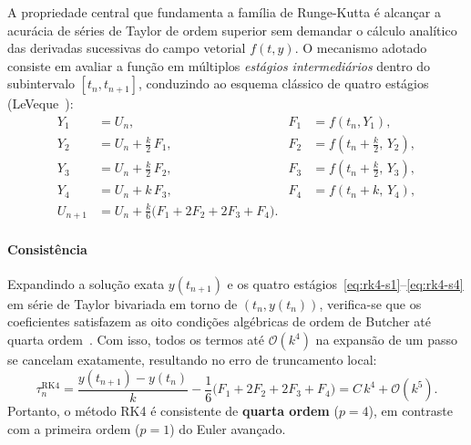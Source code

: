 \documentclass[12pt, a4paper]{article}
\begin{document}
A propriedade central que fundamenta a família de Runge-Kutta é alcançar a acurácia de séries de Taylor de ordem superior sem demandar o cálculo analítico das derivadas sucessivas do campo vetorial $f(t, y)$. O mecanismo adotado consiste em avaliar a função em múltiplos \emph{estágios intermediários} dentro do subintervalo $[t_n, t_{n+1}]$, conduzindo ao esquema clássico de quatro estágios (LeVeque~\cite{leveque2007}):
\begin{subequations}\label{eq:rk4}
\begin{align}
  Y_1 &= U_n,                          & F_1 &= f(t_n, Y_1), \label{eq:rk4-s1}\\
  Y_2 &= U_n + \frac{k}{2}\,F_1,       & F_2 &= f\!\left(t_n + \frac{k}{2},\, Y_2\right), \label{eq:rk4-s2}\\
  Y_3 &= U_n + \frac{k}{2}\,F_2,       & F_3 &= f\!\left(t_n + \frac{k}{2},\, Y_3\right), \label{eq:rk4-s3}\\
  Y_4 &= U_n + k\,F_3,                 & F_4 &= f(t_n + k,\, Y_4), \label{eq:rk4-s4}\\
  U_{n+1} &= U_n + \frac{k}{6}\bigl(F_1 + 2F_2 + 2F_3 + F_4\bigr). \label{eq:rk4-comb}
\end{align}
\end{subequations}

\paragraph{Consistência} Expandindo a solução exata $y(t_{n+1})$ e os quatro estágios~\eqref{eq:rk4-s1}--\eqref{eq:rk4-s4}
em série de Taylor bivariada em torno de $(t_n, y(t_n))$, verifica-se que os coeficientes satisfazem as oito condições
algébricas de ordem de Butcher até quarta ordem~\cite{hairer1993,leveque2007}. Com isso, todos os termos até $\mathcal{O}(k^4)$ na
expansão de um passo se cancelam exatamente, resultando no erro de truncamento local:
\begin{equation}\label{eq:lte-rk4}
  \tau_n^{\text{RK4}} = \frac{y(t_{n+1}) - y(t_n)}{k} - \frac{1}{6}\bigl(F_1 + 2F_2 + 2F_3 + F_4\bigr) = C\,k^4 + \mathcal{O}(k^5).
\end{equation}
Portanto, o método RK4 é consistente de \textbf{quarta ordem} ($p = 4$), em contraste com a primeira ordem ($p = 1$) do
Euler avançado. 
\end{document}
